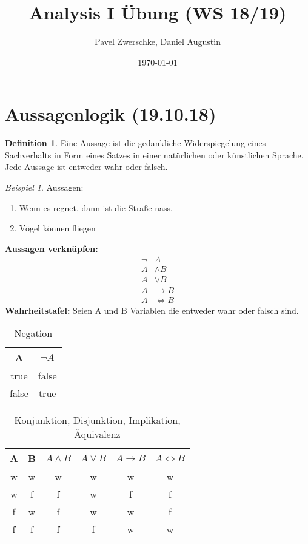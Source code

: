 \documentclass[12pt,a4paper,titlepage]{article} %
\theoremstyle{definition}
\newtheorem{defi}[satz]{Definition}
\theoremstyle{remark}
\newtheorem*{bsp}{Beispiel}
\begin{document}
	\title{Analysis I Übung (WS 18/19)}
	\date{\today}
	\author{Pavel Zwerschke, Daniel Augustin}
	\maketitle
	
	\tableofcontents
	\newpage	
	\section{Aussagenlogik (19.10.18)}
	\begin{defi}
		Eine Aussage ist die gedankliche Widerspiegelung eines Sachverhalts in Form eines Satzes in einer natürlichen oder künstlichen Sprache.
		\vspace{5mm}\\
		Jede Aussage ist entweder wahr oder falsch.
	\end{defi}
	\begin{bsp}
		Aussagen:
		\begin{enumerate}
			\item Wenn es regnet, dann ist die Straße nass.
			\item Vögel können fliegen
		\end{enumerate}
	\end{bsp}
	\textbf{Aussagen verknüpfen:}
	\begin{align*}
		\neg &A\\
		A &\wedge B\\
		A &\vee B\\
		A &\rightarrow B\\
		A &\Leftrightarrow B
	\end{align*}
	\textbf{Wahrheitstafel:}
	Seien A und B Variablen die entweder wahr oder falsch sind.	
	\begin{table}[H]
		\centering
		\begin{tabular}{c | c}			
			A & \(\neg A\) \\ 
			\hline
			true & false \\
			false & true
		\end{tabular}
		\caption{Negation}
	\end{table}	
	\begin{table}[H]
		\centering
		\begin{tabular}{c | c | c | c | c | c}			
			A & B & \(A \wedge B\) & \(A \vee B\) & \(A \rightarrow B\) & \(A \Leftrightarrow B\) \\
			\hline
			w & w & w & w & w & w \\
			w & f & f & w & f & f \\
			f & w & f & w & w & f \\
			f & f & f & f & w & w
			
		\end{tabular}
		\caption{Konjunktion, Disjunktion, Implikation, Äquivalenz}
	\end{table}
\end{document}
